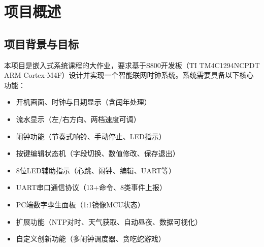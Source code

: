 \documentclass[12pt,hyperref,a4paper,UTF8]{ctexart}
\begin{document}
\cover

\begin{abstract}

本课程设计基于TI TM4C1294NCPDT (S800开发板) 设计并实现了一套\textbf{智能联网时钟系统}。MCU端独立运行本地时钟、闹钟、编辑状态机、流水显示等全部核心功能，通过UART 115200 8N1串口协议与PC端PyQt5数字孪生面板通信。PC端1:1镜像MCU数码管、LED、按键状态，并提供完整的P2控制面板（7个标签页）、NTP网络对时(E1)、天气获取(E2)、自动昼夜模式(E3)、数据可视化(E4)以及多闹钟调度器等扩展功能。实现了贪吃蛇小游戏作为自定义创新的MCU+PC联动功能。

系统通过了100条自动化协议测试，TIMEOUT=0，所有功能正常运行。本报告详细阐述了系统架构设计、MCU端硬件驱动与功能模块、PC端数字孪生与控制面板、串口通信协议设计、ARMCC5编译器适配与优化历程，以及完整的测试验证过程。

\end{abstract}

\thispagestyle{empty} %

\newpage
\tableofcontents

\newpage

\section{项目概述}

\subsection{项目背景与目标}

本项目是嵌入式系统课程的大作业，要求基于S800开发板（TI TM4C1294NCPDT ARM Cortex-M4F）设计并实现一个智能联网时钟系统。系统需要具备以下核心功能：

\begin{itemize}
    \item 开机画面、时钟与日期显示（含闰年处理）
    \item 流水显示（左/右方向、两档速度可调）
    \item 闹钟功能（节奏式响铃、手动停止、LED指示）
    \item 按键编辑状态机（字段切换、数值修改、保存退出）
    \item 8位LED辅助指示（心跳、闹钟、编辑、UART等）
    \item UART串口通信协议（13+命令、8类事件上报）
    \item PC端数字孪生面板（1:1镜像MCU状态）
    \item 扩展功能（NTP对时、天气获取、自动昼夜、数据可视化）
    \item 自定义创新功能（多闹钟调度器、贪吃蛇游戏）
\end{itemize}
\end{document}
